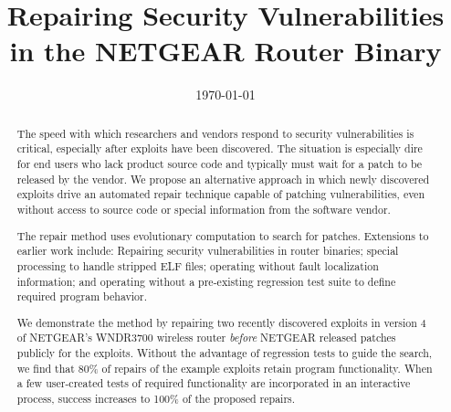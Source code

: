 \documentclass{sigcomm-alternate}
\date{\today}
\title{Repairing Security Vulnerabilities \\in the NETGEAR Router Binary}
\begin{document}
\maketitle
\usetikzlibrary{arrows,decorations,decorations.pathreplacing,shapes}

\begin{abstract}
The speed with which researchers and vendors respond to security
vulnerabilities is critical, especially after exploits have been discovered.
The situation is especially dire for end users who lack
product source code and typically must wait for a patch to be released
by the vendor.
We propose an alternative approach in which newly discovered
exploits drive an automated repair technique capable of patching
vulnerabilities, even without access to source code or special
information from the software vendor.

The repair method uses evolutionary computation to search for patches.
Extensions to earlier work include: Repairing security vulnerabilities
in router binaries; special processing to handle stripped ELF files;
operating without fault localization information; and operating
without a pre-existing regression test suite to define required
program behavior.

We demonstrate the method by repairing two recently discovered exploits
in version 4 of NETGEAR's WNDR3700 wireless router \emph{before}
NETGEAR released patches publicly for the exploits. 
Without the advantage of regression tests to guide the search, we find that 80\% of
repairs of the example exploits retain program functionality.
When a few user-created tests of required functionality are
incorporated in an interactive process, success increases to 100\% of
the proposed repairs.

\end{abstract}
\end{document}
